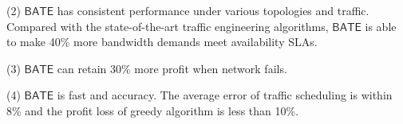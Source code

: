 \documentclass[sigconf]{acmart}
\begin{document}
(2) $\mathsf{BATE}$ has consistent performance under various topologies and traffic.
Compared with the state-of-the-art traffic engineering algorithms, $\mathsf{BATE}$ is able to make  40\% more bandwidth demands meet availability SLAs.

(3) $\mathsf{BATE}$ can retain 30\% more profit when network fails.

(4)  $\mathsf{BATE}$ is fast and accuracy.
The average error of traffic scheduling is within 8\% and the profit loss of greedy algorithm is less than 10\%. 




%  
%
\end{document}
